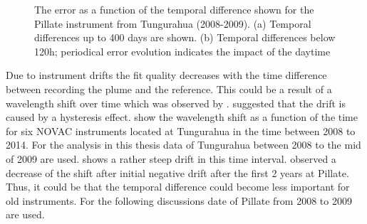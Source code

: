 \documentclass  [
  paper    = a4,
  BCOR     = 10mm,
  twoside,
  fontsize = 12pt,
  fleqn,
  toc      = bibnumbered,
  toc      = listofnumbered,
  numbers  = noendperiod,
  headings = normal,
  listof   = leveldown,
  version  = 3.03
]                                       {scrreprt}
\begin{document}
	\begin{figure}
		
		\caption{The   error as a function of the temporal difference shown for the Pillate instrument from Tungurahua (2008-2009). (a) Temporal differences up to 400 days are shown. (b) Temporal differences below 120h; periodical   error evolution indicates the impact of the daytime}
		\label{fig:dat}
	\end{figure}
	Due to instrument drifts the fit quality decreases with the time difference between recording the plume and the reference. This could be a result of a wavelength shift over time which was observed by \cite{WarnachSimon}. \cite{WarnachSimon} suggested that the drift is caused by a hysteresis effect.  show the wavelength shift as a function of the time for six NOVAC instruments located at Tungurahua in the time between 2008 to 2014. For the analysis in this thesis data of Tungurahua between 2008 to the mid of 2009 are used.  shows a rather steep drift in this time interval. \cite{WarnachSimon} observed a decrease of the shift after initial negative drift after the first 2 years at Pillate. Thus, it could be that the temporal difference could become less important for old instruments. For the following discussions date of Pillate from 2008 to 2009 are used.\\
\end{document}
